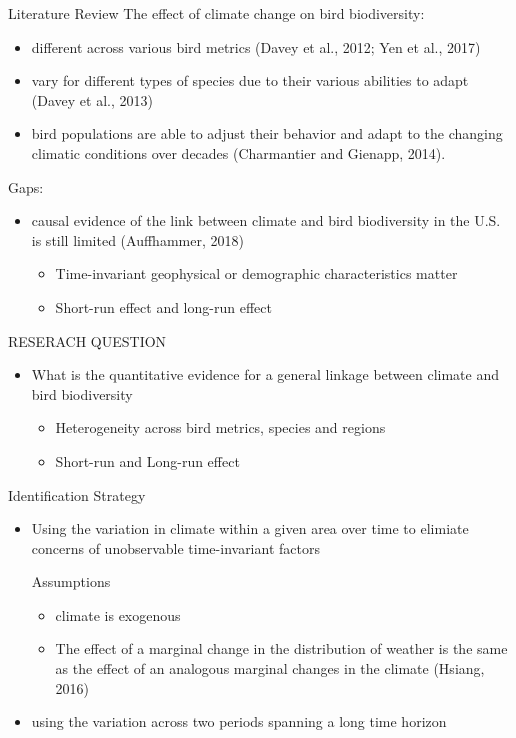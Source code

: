 \documentclass{beamer}
\begin{document}
\begin{frame}{Literature Review}
  The effect of climate change on bird biodiversity:
\begin{itemize}
  \item different across various bird metrics (Davey et al., 2012; Yen et al., 2017)
  \item vary for different types of species due to their various abilities to adapt (Davey et al., 2013)
  \item bird populations are able to adjust their behavior and adapt to the changing climatic conditions over decades (Charmantier and Gienapp, 2014).
\end{itemize}
Gaps:
\begin{itemize}
  \item causal evidence of the link between climate and bird biodiversity in the U.S. is still limited (Auffhammer, 2018)
  \begin{itemize}
    \item Time-invariant geophysical or demographic characteristics matter
    \item Short-run effect and long-run effect
  \end{itemize}
\end{itemize}
\end{frame}


\begin{frame}{RESERACH QUESTION}
  \begin{itemize}
    \item What is the quantitative evidence for a general linkage between climate and bird biodiversity
    \begin{itemize}
      \item Heterogeneity across bird metrics, species and regions
      \item Short-run and Long-run effect
    \end{itemize}
  \end{itemize}
\end{frame}


\begin{frame}{Identification Strategy}
   \begin{itemize}
     \item Using the variation in climate within a given area over time to elimiate concerns of unobservable time-invariant factors
     \begin{block}{Assumptions}
       \begin{itemize}
         \item climate is exogenous
         \item The effect of a marginal change in the distribution of weather is the same as the effect of an analogous marginal changes in the climate (Hsiang, 2016)
       \end{itemize}
     \end{block}
     \item using the variation across two periods spanning a long time horizon
   \end{itemize}
\end{frame}
\end{document}
